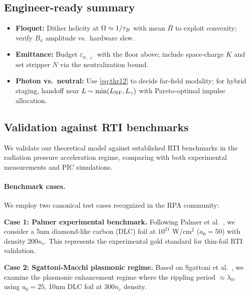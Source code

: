 \documentclass[aps,pre,twocolumn,showpacs,superscriptaddress]{revtex4-2}
\theoremstyle{definition}
\begin{document}
\subsection{Engineer-ready summary}\label{subsec:summary12}

\begin{itemize}[leftmargin=1.4em,itemsep=2pt]
\item \textbf{Floquet:} Dither helicity at $\Omega^{\*}\approx 1/\tau_B$ with mean $\bar\Pi$ to exploit convexity; verify $B_x$ amplitude vs.\ hardware slew.
\item \textbf{Emittance:} Budget $\varepsilon_{n,\perp}$ with the floor above; include space‑charge $K$ and set stripper $N$ via the neutralization bound.
\item \textbf{Photon vs.\ neutral:} Use \eqref{eq:thr12} to decide far‑field modality; for hybrid staging, handoff near $L\sim\min(L_{\rm NF},L_\gamma)$ with Pareto‑optimal impulse allocation.
\end{itemize}

\subsection{Validation against RTI benchmarks}\label{sec:validation}

We validate our theoretical model against established RTI benchmarks in the radiation pressure acceleration regime, comparing with both experimental measurements and PIC simulations.

\paragraph*{Benchmark cases.}
We employ two canonical test cases recognized in the RPA community:

\textbf{Case 1: Palmer experimental benchmark.} Following Palmer et al.~\cite{Palmer2012PRL}, we consider a 5nm diamond-like carbon (DLC) foil at $10^{21}$ W/cm$^2$ ($a_0 = 50$) with density $200n_c$. This represents the experimental gold standard for thin-foil RTI validation.

\textbf{Case 2: Sgattoni-Macchi plasmonic regime.} Based on Sgattoni et al.~\cite{Sgattoni2015PRE}, we examine the plasmonic enhancement regime where the rippling period $\approx \lambda_0$, using $a_0 = 25$, 10nm DLC foil at $300n_c$ density.
\end{document}
